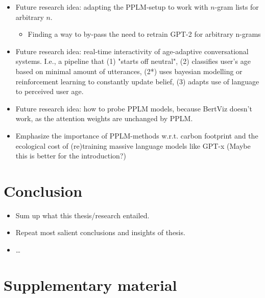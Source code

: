 \documentclass{report}
\begin{document}
\begin{itemize}
\begin{itemize}
        \end{itemize}
    \item Future research idea: adapting the PPLM-setup to work with $n$-gram lists for arbitrary $n$.
        \begin{itemize}
            \item Finding a way to by-pass the need to retrain GPT-2 for arbitrary n-grams
        \end{itemize}
    \item Future research idea: real-time interactivity of age-adaptive conversational systems. I.e., a pipeline that (1) "starts off neutral", (2) classifies user's age based on minimal amount of utterances, (2*) uses bayesian modelling or reinforcement learning to constantly update belief, (3) adapts use of language to perceived user age.
    \item Future research idea: how to probe PPLM models, because BertViz doesn't work, as the attention weights are unchanged by PPLM.
    \item Emphasize the importance of PPLM-methods w.r.t. carbon footprint and the ecological cost of (re)training massive language models like GPT-x (Maybe this is better for the introduction?)
\end{itemize}

\chapter{Conclusion}

\begin{itemize}
    \item Sum up what this thesis/research entailed.
    \item Repeat most salient conclusions and insights of thesis.
    \item \dots
\end{itemize}

\newpage
\singlespacing



\newpage
\doublespacing
\appendix
\chapter{Supplementary material}

\end{document}
